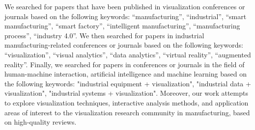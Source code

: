 \documentclass[a4paper,fleqn]{cas-dc}
\begin{document}
We searched for papers that have been published in visualization conferences or journals based on the following keywords: ``manufacturing'', ``industrial'', ``smart manufacturing'', ``smart factory'', ``intelligent manufacturing'', ``manufacturing process'', ``industry 4.0''.
We then searched for papers in industrial manufacturing-related conferences or journals based on the following keywords: ``visualization'', ``visual analytics'', ``data analytics'', ``virtual reality'', ``augmented reality''.
Finally, we searched for papers in conferences or journals in the field of human-machine interaction, artificial intelligence and machine learning based on the following keywords: "industrial equipment + visualization", "industrial data + visualization", "industrial systems + visualization".
Moreover, our work attempts to explore visualization techniques, interactive analysis methods, and application areas of interest to the visualization research community in manufacturing, based on high-quality reviews.
\end{document}
